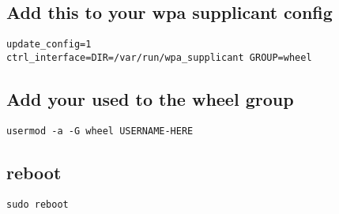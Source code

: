 \documentclass{article}
\begin{document}
\begin{center}
  \section{Add this to your wpa supplicant config}
\end{center}

\begin{lstlisting}
update_config=1
ctrl_interface=DIR=/var/run/wpa_supplicant GROUP=wheel
\end{lstlisting}


\begin{center}
  \section{Add your used to the wheel group}
\end{center}

\begin{lstlisting}
usermod -a -G wheel USERNAME-HERE
\end{lstlisting}


\begin{center}
  \section{reboot}
\end{center}

\begin{lstlisting}
sudo reboot
\end{lstlisting}
\end{document}
